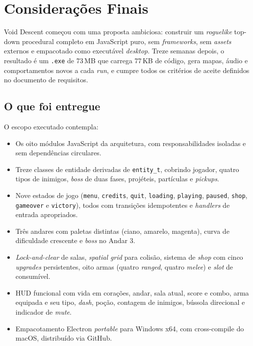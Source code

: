 \chapter{Considerações Finais}

Void Descent começou com uma proposta ambiciosa: construir um \emph{roguelike} top-down
procedural completo em JavaScript puro, sem \emph{frameworks}, sem \emph{assets}
externos e empacotado como executável \emph{desktop}. Treze semanas depois, o resultado
é um \texttt{.exe} de 73\,MB que carrega 77\,KB de código, gera mapas, áudio e
comportamentos novos a cada \emph{run}, e cumpre todos os critérios de aceite definidos
no documento de requisitos.

\section{O que foi entregue}

O escopo executado contempla:

\begin{itemize}
  \item Os oito módulos JavaScript da arquitetura, com responsabilidades isoladas e
    sem dependências circulares.
  \item Treze classes de entidade derivadas de \texttt{entity\_t}, cobrindo jogador,
    quatro tipos de inimigos, \emph{boss} de duas fases, projéteis, partículas e
    \emph{pickups}.
  \item Nove estados de jogo (\texttt{menu}, \texttt{credits}, \texttt{quit},
    \texttt{loading}, \texttt{playing}, \texttt{paused}, \texttt{shop},
    \texttt{gameover} e \texttt{victory}), todos com transições idempotentes e
    \emph{handlers} de entrada apropriados.
  \item Três andares com paletas distintas (ciano, amarelo, magenta), curva de
    dificuldade crescente e \emph{boss} no Andar 3.
  \item \emph{Lock-and-clear} de salas, \emph{spatial grid} para colisão, sistema de
    \emph{shop} com cinco \emph{upgrades} persistentes, oito armas (quatro
    \emph{ranged}, quatro \emph{melee}) e \emph{slot} de consumível.
  \item HUD funcional com vida em corações, andar, sala atual, score e combo, arma
    equipada e seu tipo, \emph{dash}, poção, contagem de inimigos, bússola direcional
    e indicador de \emph{mute}.
  \item Empacotamento Electron \emph{portable} para Windows x64, com cross-compile do
    macOS, distribuído via GitHub.
\end{itemize}

